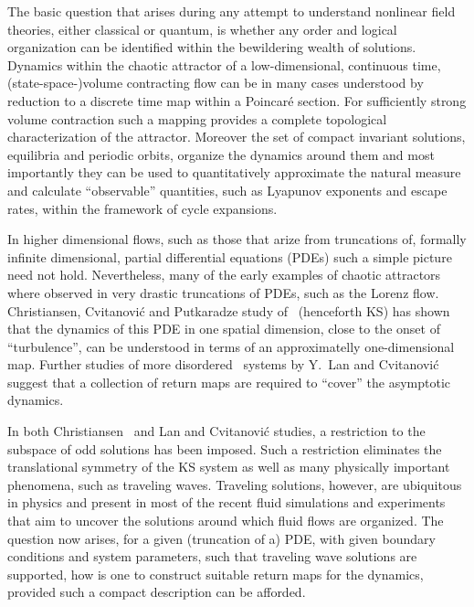 
The basic question that arises during any attempt to understand
nonlinear field theories, either classical or
quantum, is whether any order and logical organization can be
identified within the bewildering wealth of solutions. Dynamics
within the chaotic attractor of a low-dimensional, continuous
time, (state-space-)volume contracting flow can be in many
cases understood by reduction to a discrete time map within a
Poincar\'e section. For sufficiently strong volume contraction
such a mapping provides a complete topological characterization
of the attractor. Moreover the set of compact
invariant solutions, equilibria and periodic orbits, organize
the dynamics around them and most importantly they can be used
to quantitatively approximate the natural measure and calculate
``observable'' quantities, such as Lyapunov exponents and
escape rates, within the framework of cycle
expansions.

In higher dimensional flows, such as those that arize from truncations of, formally
infinite dimensional, partial differential equations (PDEs) such a simple picture
need not hold. Nevertheless, many of the early examples of chaotic attractors where
observed in very drastic truncations of PDEs, such as the Lorenz flow.
Christiansen, Cvitanovi\'{c} and Putkaradze study of 
\KSe\ (henceforth KS) has shown that the dynamics of this PDE in one spatial dimension, close to the 
onset of ``turbulence'', can be understood in terms of an approximatelly one-dimensional map.
Further studies of more disordered \KS\ systems by Y.~Lan and Cvitanovi\'{c}
suggest that a collection of return maps are required to ``cover'' the asymptotic dynamics.

In both Christiansen \etal\ and Lan and Cvitanovi\'{c} studies, a restriction to the 
subspace of odd solutions has been imposed. Such a restriction eliminates the translational 
symmetry of the KS system as well as many physically important phenomena, such as
traveling waves. Traveling solutions, however, are ubiquitous in physics and present 
in most of the recent fluid simulations 
and experiments 
that aim to uncover the solutions around which fluid flows are organized.
The question now arises, for a given (truncation of a) PDE, with
given boundary conditions and system parameters, such that
traveling wave solutions are supported, how is one to construct suitable return maps
for the dynamics, provided such a compact description can be afforded. 

